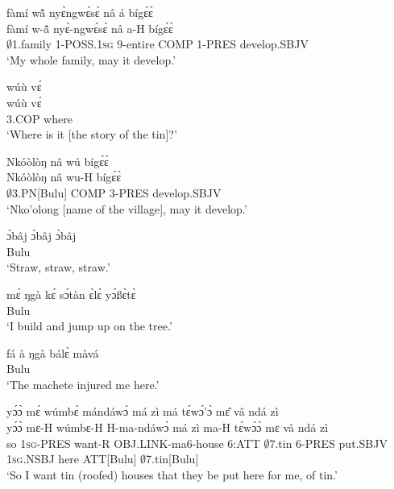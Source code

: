 \begin{exe} 
\exC\label{25}
  \glll     fàmí wã̂ nyɛ̀ngwɛ́sɛ̀ nâ á bígɛ́ɛ̀ \\
           fàmí w-ã̂ nyɛ̀-ngwɛ́sɛ̀ nâ a-H bígɛ́ɛ̀ \\
              $\emptyset$1.family 1-POSS.1\textsc{sg} 9-entire COMP 1-PRES develop.SBJV \\
    \trans `My whole family, may it develop.'
\end{exe}

\begin{exe} 
\exC\label{26}
  \glll     wúù vɛ́ \\
         wúù vɛ́ \\
              3.COP where \\
    \trans `Where is it [the story of the tin]?'
\end{exe}

\begin{exe} 
\exC\label{27}
  \glll     Nkóòlòŋ nâ wú bígɛ́ɛ̀ \\
        Nkóòlòŋ nâ wu-H bígɛ́ɛ̀ \\
              $\emptyset$3.PN[Bulu] COMP 3-PRES develop.SBJV \\
    \trans `Nko'olong [name of the village], may it develop.'
\end{exe}

\begin{exe} 
\exC\label{28}
  \gll   ɔ̀bâj ɔ̀bâj ɔ̀bâj \\
              [straw straw straw]Bulu \\
    \trans `Straw, straw, straw.'
\end{exe}

\begin{exe} 
\exC\label{29}
  \gll    mɛ́ ŋgà kɛ́ sɔ́tàn ɛ̀lɛ̀ yɔ́ßɛ̀tɛ̀  \\
              [1\textsc{sg} build go jump tree top]Bulu \\
    \trans `I build and jump up on the tree.'
\end{exe}

\begin{exe} 
\exC\label{30}
  \gll     fá à ŋgà bálɛ̀ màvá \\
             [machete 3\textsc{sg} 1\textsc{sg} hurt here]Bulu \\
    \trans `The machete injured me here.'
\end{exe}

\begin{exe} 
\exC\label{31}
  \glll     yɔ́ɔ̀ mɛ́ wúmbɛ́ mándáwɔ̀ má zì má tɛ́wɔ́'ɔ̀ mɛ̂ vâ ndá zì \\
            yɔ́ɔ̀ mɛ-H wúmbɛ-H H-ma-ndáwɔ̀ má zì ma-H tɛ́wɔ̀ɔ̀ mɛ vâ ndá zì \\
              so 1\textsc{sg}-PRES want-R OBJ.LINK-ma6-house 6:ATT $\emptyset$7.tin 6-PRES put.SBJV 1\textsc{sg}.NSBJ here ATT[Bulu] $\emptyset$7.tin[Bulu]\\
    \trans `So I want tin (roofed) houses that they be put here for me, of tin.'
\end{exe}

